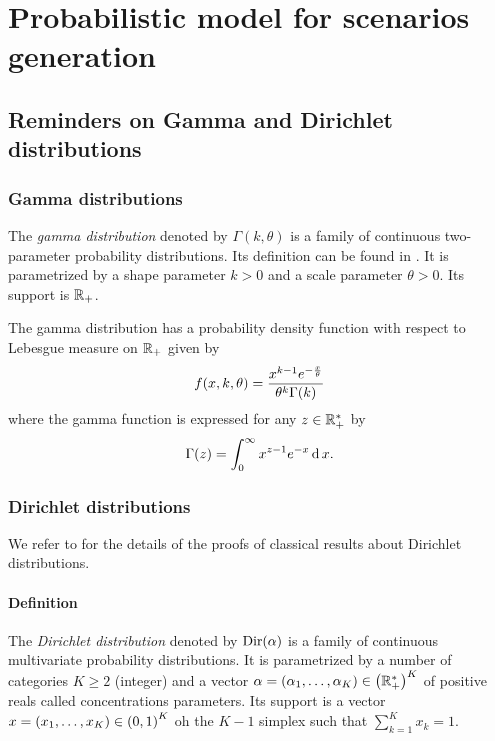 \chapter{Probabilistic model for scenarios generation}
\label{chap:appendix:probabilistic-model}


\section{Reminders on Gamma and Dirichlet distributions}
\label{sec:reminders:gamma-and-dirichlet-distributions}


\subsection{Gamma distributions}


The \emph{gamma distribution} denoted by $\Gamma(k,\theta)$ is a family of continuous two-parameter probability distributions.
Its definition can be found in \citet[Appendix A]{Delmas2006}.
It is parametrized by a shape parameter $k>0$ and a scale parameter $\theta>0$.
Its support is $\mathbb{R}_+$.


The gamma distribution has a probability density function with respect to Lebesgue measure on $\mathbb{R}_+$ given by
\begin{equation}\label{eq:dirchlet:probability-density-function}
  f\bracket{x,k,\theta} = \frac{x^{k-1}e^{-\frac{x}{\theta}}}{ \theta^k\Gamma\bracket{k} }
\end{equation}
where the gamma function is expressed for any $z\in\mathbb{R}_+^*$ by
\begin{equation}
  \Gamma\bracket{z} = \int_0^{\infty} x^{z-1}e^{-x} \diff x.
\end{equation}


\subsection{Dirichlet distributions}


We refer to \citet[Chapter 49]{Kotz2000} for the details of the proofs of classical results about Dirichlet distributions.


\subsubsection{Definition}


The \emph{Dirichlet distribution} denoted by $\operatorname{Dir}(\alpha)$ is a family of continuous multivariate probability distributions.
It is parametrized by a number of categories $K \ge 2$ (integer) and a vector $\alpha=\bracket{\alpha_1,\ldots,\alpha_K}\in\bracket{\RR_+^*}^K$ of positive reals called concentrations parameters.
Its support is a vector $x=\bracket{x_1,\ldots,x_K}\in\bracket{0,1}^K$ oh the $K-1$ simplex \ie such that $\sum_{k=1}^K x_k = 1$.


